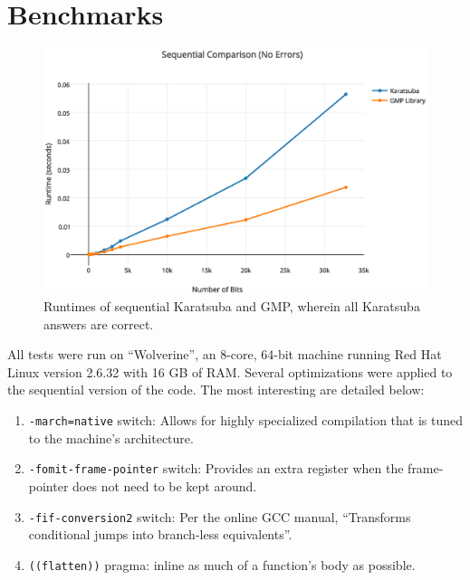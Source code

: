 \documentclass[8pt, twocolumn]{article}
\begin{document}
\section{Benchmarks}
\begin{figure}[t]
    \includegraphics[scale=0.4]{sequential-error-free}
    \caption{Runtimes of sequential Karatsuba and GMP, wherein all Karatsuba answers
    are correct.}
    \label{fig:sequential-correct}
\end{figure}
All tests were run on ``Wolverine'', an 8-core, 64-bit machine running Red Hat
Linux version 2.6.32 with 16 GB of RAM.  Several optimizations were applied to
the sequential version of the code.  The most interesting are detailed below:
\begin{enumerate}
    \item \texttt{-march=native} switch: Allows for highly specialized compilation
          that is tuned to the machine's architecture.
    \item \texttt{-fomit-frame-pointer} switch: Provides an extra register when the
           frame-pointer does not need to be kept around.
    \item \texttt{-fif-conversion2} switch: Per the online GCC manual, ``Transforms
          conditional jumps into branch-less equivalents''.
    \item \texttt{((flatten))} pragma: inline as much of a function's body as
          possible.
\end{enumerate}
\end{document}
